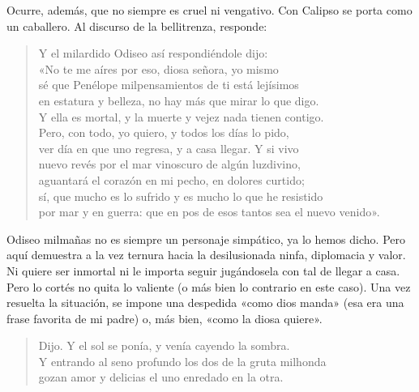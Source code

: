 \documentclass[11pt,a4paper]{article}
\begin{document}
Ocurre, además, que no siempre es cruel ni vengativo. Con Calipso se porta como un caballero. Al discurso de la bellitrenza, responde:


\begin{verse}
Y el milardido Odiseo así respondiéndole dijo:\\
«No te me aíres por eso, diosa señora, yo mismo\\
sé que Penélope milpensamientos de ti está lejísimos\\
en estatura y belleza, no hay más que mirar lo que digo.\\
Y ella es mortal, y la muerte y vejez nada tienen contigo.\\
Pero, con todo, yo quiero, y todos los días lo pido,\\
ver día en que uno regresa, y a casa llegar. Y si vivo\\
nuevo revés por el mar vinoscuro de algún luzdivino,\\
aguantará el corazón en mi pecho, en dolores curtido;\\
sí, que mucho es lo sufrido y es mucho lo que he resistido\\
por mar y en guerra: que en pos de esos tantos sea el nuevo venido».
\end{verse}

Odiseo milmañas no es siempre un personaje simpático, ya lo hemos dicho. Pero aquí demuestra a la vez ternura hacia la desilusionada ninfa, diplomacia y valor. Ni quiere ser inmortal ni le importa seguir jugándosela con tal de llegar a casa. Pero lo cortés no quita lo valiente (o más bien lo contrario en este caso). Una vez resuelta la situación, se impone una despedida «como dios manda» (esa era una frase favorita de mi padre) o, más bien, «como la diosa quiere».

\begin{verse}
Dijo. Y el sol se ponía, y venía cayendo la sombra.\\
Y entrando al seno profundo los dos de la gruta milhonda\\
gozan amor y delicias el uno enredado en la otra.
\end{verse}
\end{document}
